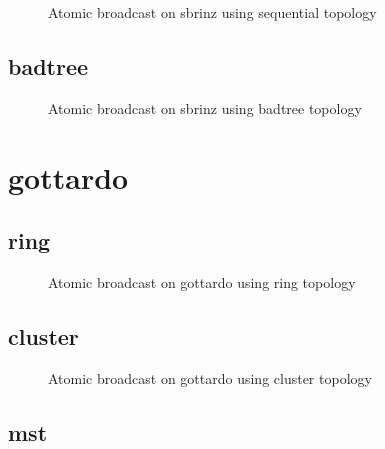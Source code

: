 \begin{figure}[ht!]

\caption{Atomic broadcast on sbrinz using sequential topology}
\label{fig:ab_sbrinz_sequential}
\end{figure}
\clearpage\subsection{badtree}

\begin{figure}[ht!]

\caption{Atomic broadcast on sbrinz using badtree topology}
\label{fig:ab_sbrinz_badtree}
\end{figure}
\clearpage\newpage\clearpage\section{gottardo}

\subsection{ring}

\begin{figure}[ht!]

\caption{Atomic broadcast on gottardo using ring topology}
\label{fig:ab_gottardo_ring}
\end{figure}
\clearpage\subsection{cluster}

\begin{figure}[ht!]

\caption{Atomic broadcast on gottardo using cluster topology}
\label{fig:ab_gottardo_cluster}
\end{figure}
\clearpage\subsection{mst}

